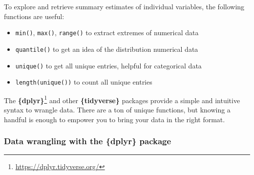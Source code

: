 \documentclass[
]{krantz}
\makeatletter
\newenvironment{Shaded}{\begin{snugshade}}{\end{snugshade}}
\newcommand{\DocumentationTok}[1]{\textcolor[rgb]{0.37,0.37,0.37}{\textbf{\textit{#1}}}}
\newcommand{\FunctionTok}[1]{\textcolor[rgb]{0,0,0}{#1}}
\newcommand{\NormalTok}[1]{#1}
\newcommand{\SpecialCharTok}[1]{\textcolor[rgb]{0,0,0}{#1}}
\providecommand{\tightlist}{%
  \setlength{\itemsep}{0pt}\setlength{\parskip}{0pt}}
\renewcommand{\href}[2]{#2\footnote{\url{#1}}}
\newenvironment{kframe}{%
\medskip{}
\setlength{\fboxsep}{.8em}
 \def\at@end@of@kframe{}%
 \ifinner\ifhmode%
  \def\at@end@of@kframe{\end{minipage}}%
  \begin{minipage}{\columnwidth}%
 \fi\fi%
 \def\FrameCommand##1{\hskip\@totalleftmargin \hskip-\fboxsep
 \colorbox{shadecolor}{##1}\hskip-\fboxsep
     \hskip-\linewidth \hskip-\@totalleftmargin \hskip\columnwidth}%
 \MakeFramed {\advance\hsize-\width
   \@totalleftmargin\z@ \linewidth\hsize
   \@setminipage}}%
 {\par\unskip\endMakeFramed%
 \at@end@of@kframe}
\renewenvironment{Shaded}{\begin{kframe}}{\end{kframe}}
\makeatother
\begin{document}
To explore and retrieve summary estimates of individual variables, the following functions are useful:

\begin{itemize}
\tightlist
\item
  \texttt{min()}, \texttt{max()}, \texttt{range()} to extract extremes of numerical data
\item
  \texttt{quantile()} to get an idea of the distribution numerical data
\item
  \texttt{unique()} to get all unique entries, helpful for categorical data
\item
  \texttt{length(unique())} to count all unique entries
\end{itemize}

\begin{Shaded}
\end{Shaded}

The \href{https://dplyr.tidyverse.org/}{\textbf{\{dplyr\}}} \citep{dplyr} and other \textbf{\{tidyverse\}} packages provide a simple and intuitive syntax to wrangle data. There are a ton of unique functions, but knowing a handful is enough to empower you to bring your data in the right format.

\hypertarget{dplyr}{%
\subsubsection{Data wrangling with the \{dplyr\} package}\label{dplyr}}
\end{document}
